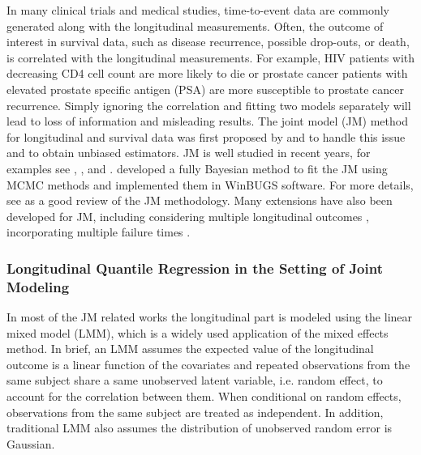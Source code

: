 In many clinical trials and medical studies, time-to-event data are commonly generated along with the longitudinal measurements. Often, the outcome of interest in survival data, such as disease recurrence, possible drop-outs, or death, is correlated with the longitudinal measurements. For example, HIV patients with decreasing CD4 cell count are more likely to die or prostate cancer patients with elevated prostate specific antigen (PSA) are more susceptible to prostate cancer recurrence. Simply ignoring the correlation and fitting two models separately will lead to loss of information and misleading results. The joint model (JM) method for longitudinal and survival data was first proposed by \cite{tsiatis1995modeling} and \cite{faucett1996simultaneously} to handle this issue and to obtain unbiased estimators. JM is well studied in recent years, for examples see \cite{henderson2000joint}, \cite{wang2001jointly}, and \cite{xu2001joint}. \cite{guo2004separate} developed a fully Bayesian method to fit the JM using MCMC methods and implemented them in WinBUGS software. For more details, see \cite{yu2004joint} as a good review of the JM methodology. Many extensions have also been developed for JM, including considering multiple longitudinal outcomes \citep{brown2005flexible,rizopoulos2011bayesian}, incorporating multiple failure times \citep{elashoff2008joint}. \par


\subsubsection{Longitudinal Quantile Regression in the Setting of Joint Modeling }\label{sec:bak_lqm_jm}
In most of the JM related works the longitudinal part is modeled using the linear mixed model (LMM), which is a widely used application of the mixed effects method. In brief, an LMM assumes the expected value of the longitudinal outcome is a linear function of the covariates and repeated observations from the same subject share a same unobserved latent variable, i.e. random effect, to account for the correlation between them. When conditional on random effects, observations from the same subject are treated as independent. In addition, traditional LMM also assumes the distribution of unobserved random error is Gaussian.\par

